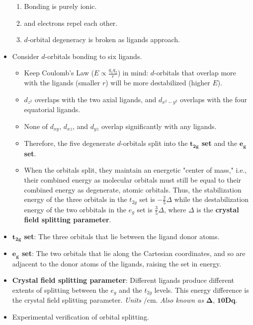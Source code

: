 \documentclass[../notes.tex]{subfiles}
\begin{document}
\begin{itemize}
\begin{enumerate}
        \item Bonding is purely ionic.
        \item {} and  electrons repel each other.
        \item $d$-orbital degeneracy is broken as ligands approach.
    \end{enumerate}
    \item Consider $d$-orbitals bonding to six ligands.
    \begin{itemize}
        \item Keep Coulomb's Law ($E\propto\frac{q_1q_2}{r}$) in mind: $d$-orbitals that overlap more with the ligands (smaller $r$) will be more destabilized (higher $E$).
        \item $d_{z^2}$ overlaps with the two axial ligands, and $d_{x^2-y^2}$ overlaps with the four equatorial ligands.
        \item None of $d_{xy}$, $d_{xz}$, and $d_{yz}$ overlap significantly with any ligands.
        \item Therefore, the five degenerate $d$-orbitals split into the \textbf{$\bm{t_{2g}}$ set} and the \textbf{$\bm{e_g}$ set}.
        \item When the orbitals split, they maintain an energetic "center of mass," i.e., their combined energy as molecular orbitals must still be equal to their combined energy as degenerate, atomic orbitals. Thus, the stabilization energy of the three orbitals in the $t_{2g}$ set is $-\frac{2}{5}\Delta$ while the destabilization energy of the two orbbitals in the $e_g$ set is $\frac{3}{5}\Delta$, where $\Delta$ is the \textbf{crystal field splitting parameter}.
    \end{itemize}
    \item \textbf{$\bm{t_{2g}}$ set}: The three orbitals that lie between the ligand donor atoms.
    \item \textbf{$\bm{e_g}$ set}: The two orbitals that lie along the Cartesian coordinates, and so are adjacent to the donor atoms of the ligands, raising the set in energy.
    \item \textbf{Crystal field splitting parameter}: Different ligands produce different extents of splitting between the $e_g$ and the $t_{2g}$ levels. This energy difference is the crystal field splitting parameter. \emph{Units} $\si{\per\centi\meter}$. \emph{Also known as} $\bm{\Delta}$, $\bm{10Dq}$.
    \item Experimental verification of orbital splitting.
    \begin{itemize}

\end{itemize}
\end{itemize}
\end{document}
